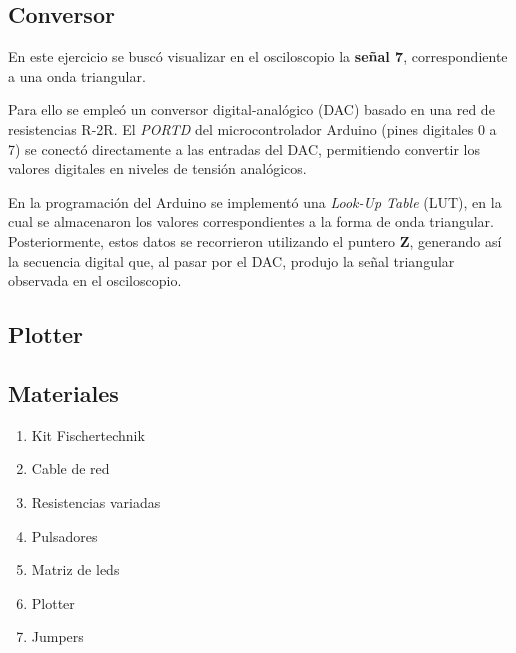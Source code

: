\vspace{10em}


\subsection{Conversor}
En este ejercicio se buscó visualizar en el osciloscopio la \textbf{señal 7}, correspondiente a una onda triangular.

Para ello se empleó un conversor digital-analógico (DAC) basado en una red de resistencias R-2R. El \textit{PORTD} del microcontrolador Arduino (pines digitales 0 a 7) se conectó directamente a las entradas del DAC, permitiendo convertir los valores digitales en niveles de tensión analógicos.

En la programación del Arduino se implementó una \textit{Look-Up Table} (LUT), en la cual se almacenaron los valores correspondientes a la forma de onda triangular. Posteriormente, estos datos se recorrieron utilizando el puntero \textbf{Z}, generando así la secuencia digital que, al pasar por el DAC, produjo la señal triangular observada en el osciloscopio.

\subsection{Plotter}
\subsection{Materiales}
\begin{enumerate}
    \item Kit Fischertechnik
    \item Cable de red
    \item Resistencias variadas
    \item Pulsadores
    \item Matriz de leds
    \item Plotter 
    \item Jumpers
\end{enumerate}